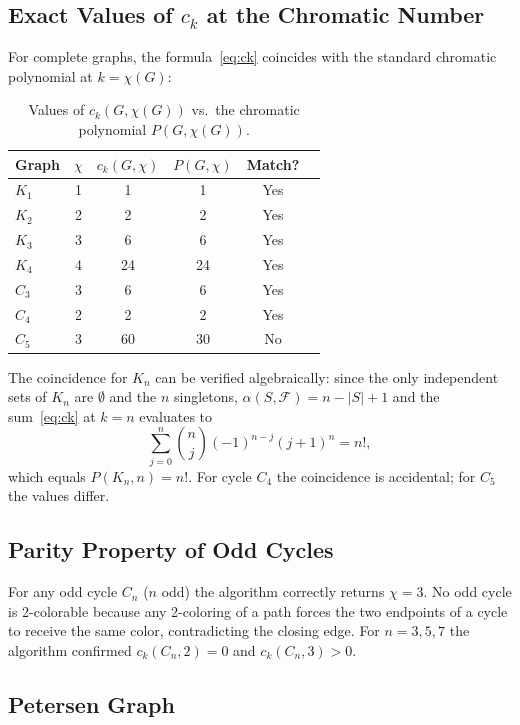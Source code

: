 \documentclass[11pt]{article}
\begin{document}
\subsection{Exact Values of $c_k$ at the Chromatic Number}

For complete graphs, the formula~\eqref{eq:ck} coincides with the standard
chromatic polynomial at $k = \chi(G)$:

\begin{table}[h]
\centering
\caption{Values of $c_k(G, \chi(G))$ vs.\ the chromatic polynomial $P(G, \chi(G))$.}
\label{tab:poly}
\begin{tabular}{lccccc}
\toprule
Graph & $\chi$ & $c_k(G, \chi)$ & $P(G, \chi)$ & Match? \\
\midrule
$K_1$ & 1 & 1    & 1    & Yes \\
$K_2$ & 2 & 2    & 2    & Yes \\
$K_3$ & 3 & 6    & 6    & Yes \\
$K_4$ & 4 & 24   & 24   & Yes \\
$C_3$ & 3 & 6    & 6    & Yes \\
$C_4$ & 2 & 2    & 2    & Yes \\
$C_5$ & 3 & 60   & 30   & No  \\
\bottomrule
\end{tabular}
\end{table}

The coincidence for $K_n$ can be verified algebraically: since the only
independent sets of $K_n$ are $\emptyset$ and the $n$ singletons,
$\alpha(S, \mathcal{F}) = n - |S| + 1$ and the sum~\eqref{eq:ck} at $k=n$
evaluates to
\[
  \sum_{j=0}^{n} \binom{n}{j}(-1)^{n-j}(j+1)^n = n!,
\]
which equals $P(K_n, n) = n!$.  For cycle $C_4$ the coincidence is accidental;
for $C_5$ the values differ.

\subsection{Parity Property of Odd Cycles}

For any odd cycle $C_n$ ($n$ odd) the algorithm correctly returns $\chi = 3$.
No odd cycle is 2-colorable because any 2-coloring of a path forces the two
endpoints of a cycle to receive the same color, contradicting the closing edge.
For $n = 3, 5, 7$ the algorithm confirmed $c_k(C_n, 2) = 0$ and $c_k(C_n, 3)
> 0$.

\subsection{Petersen Graph}
\end{document}
